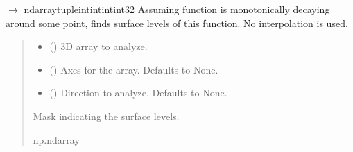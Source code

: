 \documentclass[letterpaper,10pt,english]{sphinxmanual}
\begin{document}
\begin{fulllineitems}
\label{\detokenize{source/stattools:stattools.find_decreasing_surface_levels3d}}
\pysigstartsignatures
\pysiglinewithargsret
{}
{\sphinxparamcomma {}\sphinxparamcomma {}}
{{ $\rightarrow$ ndarray\DUrole{p}{{[}}tuple\DUrole{p}{{[}}intintint\DUrole{p}{{]}}int32\DUrole{p}{{]}}}}
\pysigstopsignatures
\sphinxAtStartPar
Assuming function is monotonically decaying around some point, finds surface levels of this function.
No interpolation is used.
\begin{quote}\begin{description}
\begin{itemize}
\item {} 
\sphinxAtStartPar
{} () \textendash{} 3D array to analyze.

\item {} 
\sphinxAtStartPar
{} (\sphinxstyleliteralemphasis{\sphinxupquote{, }}) \textendash{} Axes for the array. Defaults to None.

\item {} 
\sphinxAtStartPar
{} (\sphinxstyleliteralemphasis{\sphinxupquote{, }}) \textendash{} Direction to analyze. Defaults to None.

\end{itemize}

\sphinxAtStartPar
Mask indicating the surface levels.

\sphinxAtStartPar
np.ndarray

\end{description}\end{quote}

\end{fulllineitems}
\end{document}
